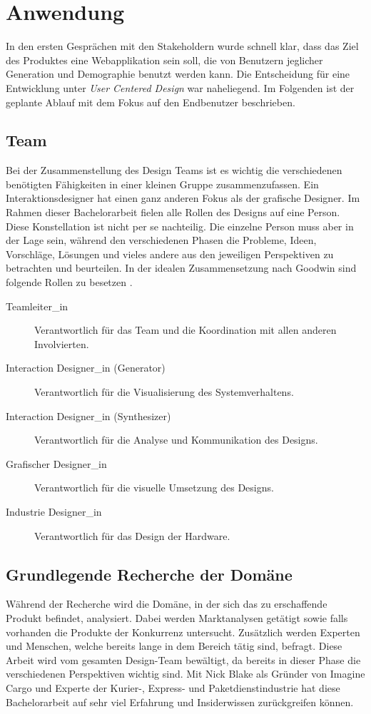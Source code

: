 \section{Anwendung}
In den ersten Gesprächen mit den Stakeholdern wurde schnell klar, dass das Ziel des Produktes eine Webapplikation sein soll, die von Benutzern jeglicher Generation und Demographie benutzt werden kann. Die Entscheidung für eine Entwicklung unter \textit{User Centered Design} war naheliegend. Im Folgenden ist der geplante Ablauf mit dem Fokus auf den Endbenutzer beschrieben.

\subsection{Team}
Bei der Zusammenstellung des Design Teams ist es wichtig die verschiedenen benötigten Fähigkeiten in einer kleinen Gruppe zusammenzufassen. Ein Interaktionsdesigner hat einen ganz anderen Fokus als der grafische Designer. Im Rahmen dieser Bachelorarbeit fielen alle Rollen des Designs auf eine Person. Diese Konstellation ist nicht per se nachteilig. Die einzelne Person muss aber in der Lage sein, während den verschiedenen Phasen die Probleme, Ideen, Vorschläge, Lösungen und vieles andere aus den jeweiligen Perspektiven zu betrachten und beurteilen. In der idealen Zusammensetzung nach Goodwin sind folgende Rollen zu besetzen \citep[Kapitel 2]{goodwin2011designing}.
\begin{description}
	\item [Teamleiter\_in] Verantwortlich für das Team und die Koordination mit allen anderen Involvierten.
	\item [Interaction Designer\_in (Generator)] Verantwortlich für die Visualisierung des Systemverhaltens.
	\item [Interaction Designer\_in (Synthesizer)] Verantwortlich für die Analyse und Kommunikation des Designs.
	\item [Grafischer Designer\_in] Verantwortlich für die visuelle Umsetzung des Designs.
	\item [Industrie Designer\_in] Verantwortlich für das Design der Hardware.
\end{description}

\subsection{Grundlegende Recherche der Domäne}
Während der Recherche wird die Domäne, in der sich das zu erschaffende Produkt befindet, analysiert. Dabei werden Marktanalysen getätigt sowie falls vorhanden die Produkte der Konkurrenz untersucht. Zusätzlich werden Experten und Menschen, welche bereits lange in dem Bereich tätig sind, befragt. Diese Arbeit wird vom gesamten Design-Team bewältigt, da bereits in dieser Phase die verschiedenen Perspektiven wichtig sind. Mit Nick Blake als Gründer von Imagine Cargo und Experte der Kurier-, Express- und Paketdienstindustrie hat diese Bachelorarbeit auf sehr viel Erfahrung und Insiderwissen zurückgreifen können.

